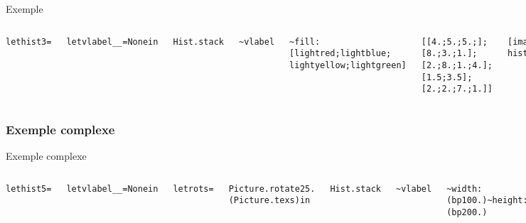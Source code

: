 \documentclass{beamer}
\begin{document}
\begin{frame}{Exemple}
  \begin{columns}
    \begin{alltt}
      let hist3 =

      let vlabel \_ \_ = None in

      Hist.stack
 
      \textasciitilde vlabel

      \textasciitilde fill:[lightred;lightblue;
      lightyellow;lightgreen]

      [[4.;5.;5.;]; [8.;3.;1.]; [2.;8.;1.;4.];
      [1.5;3.5];[2.;2.;7.;1.]]
    \end{alltt}
    \begin{center}
      \texttt{[image: hist3.mps]}
    \end{center}
  \end{columns}
\end{frame}

\subsubsection{Exemple complexe}
\begin{frame}{Exemple complexe}
  \begin{columns}
    \begin{alltt}
      \footnotesize{let hist5 =
      
      let vlabel \_ \_ = None in
      
      let rot s = 

      Picture.rotate 25. (Picture.tex s) in
      
      Hist.stack
      
      \textasciitilde vlabel 

      \textasciitilde width:(bp 100.) \textasciitilde height:(bp 200.)
      
      \textasciitilde perspective:true ~padding:(bp 15.)
      
      \textasciitilde fill:[lightred;lightblue;

      lightyellow;lightgreen]
      
      \textasciitilde histlabel:(`Center, Hist.Values)
      
      \textasciitilde vcaption:(Picture.tex "Dollars")

      \textasciitilde hlabel:[rot "2007";rot "2008";rot "2009"]
      [[4.;5.;5.;]; [8.;3.;1.]; [2.;8.;1.;4.]]}
    \end{alltt}
    \begin{center}
      \texttt{[image: hist5.mps]}
    \end{center}
  \end{columns}
\end{frame}
\end{document}
